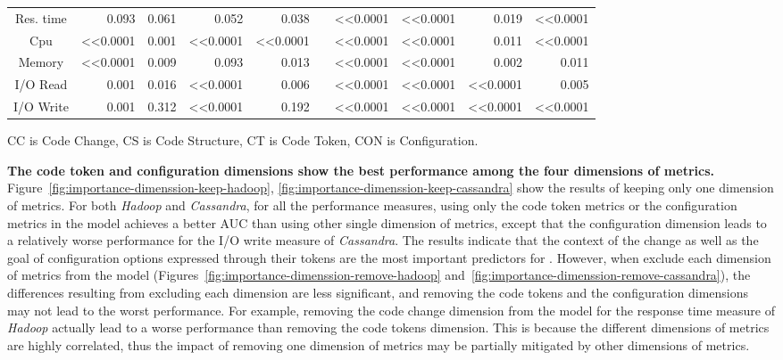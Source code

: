 \begin{table}
\begin{tabular}{|c|r|r|r|r|r|r|r|r|r|}
    Res. time & 0.093    & 0.061    & 0.052  & 0.038     &                       & \textless{}\textless{}0.0001   & \textless{}\textless{}0.0001  & 0.019& \textless{}\textless{}0.0001   \\ \cline{1-5} \cline{7-10} 
    Cpu       & \textless{}\textless{}0.0001      & 0.001    & \textless{}\textless{}0.0001    & \textless{}\textless{}0.0001       &                       & \textless{}\textless{}0.0001   & \textless{}\textless{}0.0001  & 0.011& \textless{}\textless{}0.0001   \\ \cline{1-5} \cline{7-10} 
    Memory    & \textless{}\textless{}0.0001      & 0.009    & 0.093  & 0.013     &                       & \textless{}\textless{}0.0001   & \textless{}\textless{}0.0001  & 0.002& 0.011 \\ \cline{1-5} \cline{7-10} 
    I/O Read  & 0.001    & 0.016    & \textless{}\textless{}0.0001    & 0.006     &                       & \textless{}\textless{}0.0001   & \textless{}\textless{}0.0001  & \textless{}\textless{}0.0001  & 0.005 \\ \cline{1-5} \cline{7-10} 
    I/O Write & 0.001    & 0.312    & \textless{}\textless{}0.0001    & 0.192     &                       & \textless{}\textless{}0.0001   & \textless{}\textless{}0.0001  & \textless{}\textless{}0.0001  & \textless{}\textless{}0.0001   \\ \cline{1-5} \cline{7-10} 
    \end{tabular}
\label{tab:difference}
\footnotesize{CC is Code Change, CS is Code Structure, CT is Code Token, CON is Configuration.}
\end{table}

\textbf{The code token and configuration dimensions show the best performance among the four dimensions of metrics.} Figure~\ref{fig:importance-dimenssion-keep-hadoop}, \ref{fig:importance-dimenssion-keep-cassandra} show the results of keeping only one dimension of metrics. For both \emph{Hadoop} and \emph{Cassandra}, for all the performance measures, using only the code token metrics or the configuration metrics in the model achieves a better AUC than using other single dimension of metrics, except that the configuration dimension leads to a relatively worse performance for the I/O write measure of \emph{Cassandra}.
The results indicate that the context of the change as well as the goal of configuration options expressed through their tokens are the most important predictors for \inconsistent.
However, when exclude each dimension of metrics from the model (Figures~\ref{fig:importance-dimenssion-remove-hadoop} and~\ref{fig:importance-dimenssion-remove-cassandra}), the differences resulting from excluding each dimension are less significant, and removing the code tokens and the configuration dimensions may not lead to the worst performance.
For example, removing the code change dimension from the model for the response time measure of \emph{Hadoop} actually lead to a worse performance than removing the code tokens dimension. 
This is because the different dimensions of metrics are highly correlated, thus the impact of removing one dimension of metrics may be partially mitigated by other dimensions of metrics.


